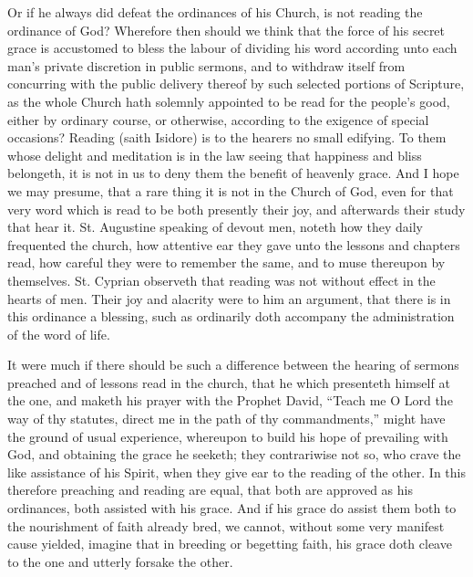 Or if he always did defeat the ordinances of his Church, is not reading the ordinance of God? Wherefore then should we think that the force of his secret grace is accustomed to bless the labour of dividing his word according unto each man’s private discretion in public sermons, and to withdraw itself from concurring with the public delivery thereof by such selected portions of Scripture, as the whole Church hath solemnly appointed to be read for the people’s good, either by ordinary course, or otherwise, according to the exigence of special occasions? Reading (saith Isidore) is to the hearers no small edifying. To them whose delight and meditation is  in the law seeing that happiness and bliss belongeth, it is not in us to deny them the benefit of heavenly grace. And I hope we may presume, that a rare thing it is not in the Church of God, even for that very word which is read to be both presently their joy, and afterwards their study that hear it. St. Augustine speaking of devout men, noteth how they daily frequented the church, how attentive ear they gave unto the lessons and chapters read, how careful they were to remember the same, and to muse thereupon by themselves. St. Cyprian observeth that reading was not without effect in the hearts of men. Their joy and alacrity were to him an argument, that there is in this ordinance a blessing, such as ordinarily doth accompany the administration of the word of life.

It were much if there should be such a difference between the hearing of sermons preached and of lessons read in the church, that he which presenteth himself at the one, and maketh his prayer with the Prophet David, “Teach me O Lord the way of thy statutes, direct me in the path of thy commandments,” might have the ground of usual experience, whereupon to build his hope of prevailing with God, and obtaining the grace he seeketh; they contrariwise not so, who crave the like assistance of his Spirit, when they give ear to the reading of the other. In this therefore preaching and reading are equal, that both are approved as his ordinances, both assisted with his grace. And if his grace do assist them both to the nourishment of faith already bred, we cannot, without some very manifest cause yielded, imagine that in breeding or begetting faith, his grace doth cleave to the one and utterly forsake the other.





